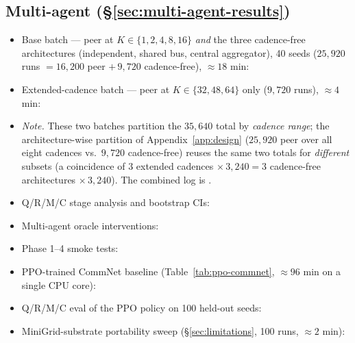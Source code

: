 \documentclass{article}
\begin{document}
\subsection*{Multi-agent (\S\ref{sec:multi-agent-results})}
\begin{itemize}[leftmargin=16pt]
\item Base batch --- peer at $K\in\{1,2,4,8,16\}$ \emph{and} the three cadence-free architectures (independent, shared bus, central aggregator), 40 seeds ($25{,}920$ runs $=16{,}200$ peer $+\,9{,}720$ cadence-free), $\approx 18$ min:
\item Extended-cadence batch --- peer at $K\in\{32,48,64\}$ only ($9{,}720$ runs), $\approx 4$ min:
\item[] \emph{Note.} These two batches partition the $35{,}640$ total by \emph{cadence range}; the architecture-wise partition of Appendix~\ref{app:design} ($25{,}920$ peer over all eight cadences vs.\ $9{,}720$ cadence-free) reuses the same two totals for \emph{different} subsets (a coincidence of $3$ extended cadences $\times\,3{,}240 = 3$ cadence-free architectures $\times\,3{,}240$). The combined log is .
\item Q/R/M/C stage analysis and bootstrap CIs:
\item Multi-agent oracle interventions:
\item Phase 1--4 smoke tests:
\item PPO-trained CommNet baseline (Table~\ref{tab:ppo-commnet}, $\approx 96$ min on a single CPU core):
\item Q/R/M/C eval of the PPO policy on 100 held-out seeds:
\item MiniGrid-substrate portability sweep (\S\ref{sec:limitations}, 100 runs, $\approx 2$ min):
\end{itemize}
\end{document}
